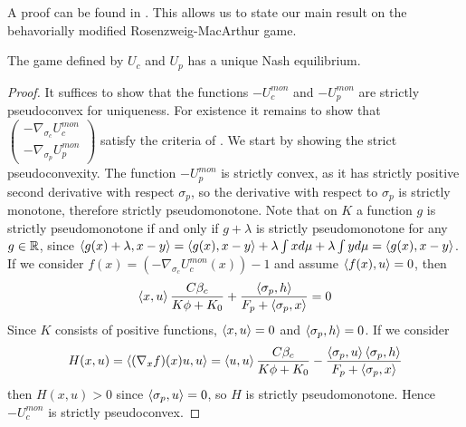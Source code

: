 A proof can be found in \citep[Proposition 2.8, p.96]{hadjisavvas2006handbook}. This allows us to state our main result on the behavorially modified Rosenzweig-MacArthur game.
\begin{proposition}
  The game defined by $U_c$ and $U_p$ has a unique Nash equilibrium.
\end{proposition}
\begin{proof}
  It suffices to show that the functions $-U_c^{mon}$ and $-U_p^{mon}$ are strictly pseudoconvex for uniqueness. For existence it remains to show that $\begin{pmatrix}-\nabla_{\sigma_c} U_c^{mon} \\ -\nabla_{\sigma_p} U_p^{mon}\end{pmatrix}$ satisfy the criteria of .
  We start by showing the strict pseudoconvexity. The function $-U_p^{mon}$ is strictly convex, as it has strictly positive second derivative with respect $\sigma_p$, so the derivative with respect to $\sigma_p$ is strictly monotone, therefore strictly pseudomonotone. Note that on $K$ a function $g$ is strictly pseudomonotone if and only if $g+\lambda$ is strictly pseudomonotone for any $g\in \mathbb{R}$, since $\left \langle g(x)+\lambda,x-y \right \rangle=\left \langle g(x),x-y \right \rangle+\lambda \int x d\mu + \lambda \int y d\mu=\left \langle g(x),x-y \right \rangle$. If we consider $f(x)=(-\nabla_{\sigma_c} U_c^{mon}(x))-1$ and assume $\left \langle f(x),u \right \rangle = 0$, then
  \begin{equation}
    \ip{x}{u}\frac{C \beta_c }{K\phi + K_0} + \frac{\ip{\sigma_p}{h}}{F_p + \ip{\sigma_p}{x}} = 0
  \end{equation}
  Since $K$ consists of positive functions, $\left \langle x,u \right \rangle = 0$ and $\left \langle \sigma_p,h \right \rangle = 0$. If we consider
  \begin{equation}
    H(x,u)=\ip{(\nabla_x f)(x)u}{u} = \ip{u}{u}\frac{ C \beta_c }{K\phi + K_0} - \frac{\ip{\sigma_p}{u}\ip{\sigma_p}{h}}{F_p + \ip{\sigma_p}{x}}
  \end{equation}
  then $H(x,u)>0$ since $\left \langle \sigma_p,u \right \rangle=0$, so $H$ is strictly pseudomonotone. Hence $-U_c^{mon}$ is strictly pseudoconvex.


\end{proof}
